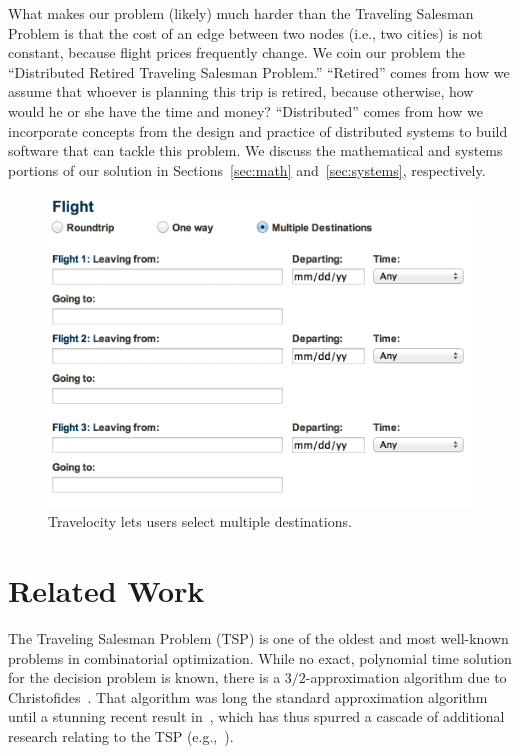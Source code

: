 \documentclass{article}
\begin{document}
What makes our problem (likely) much harder than the Traveling Salesman Problem is that the cost of an edge between two nodes (i.e., two cities) is
not constant, because flight prices frequently change. We coin our problem the ``Distributed Retired Traveling Salesman Problem.'' ``Retired'' comes
from how we assume that whoever is planning this trip is retired, because otherwise, how would he or she have the time and money?  ``Distributed''
comes from how we incorporate concepts from the design and practice of distributed systems to build software that can tackle this problem. We discuss
the mathematical and systems portions of our solution in Sections~\ref{sec:math} and~\ref{sec:systems}, respectively.

\begin{figure}[t]
\vskip 0.2in
\begin{center}
\centerline{\includegraphics[width=\columnwidth]{travelocity}}
\caption{Travelocity lets users select multiple destinations.}
\label{fig:travelocity}
\end{center}
\vskip -0.2in
\end{figure}

\section{Related Work}\label{sec:related_work}

The Traveling Salesman Problem (TSP) is one of the oldest and most well-known problems in combinatorial optimization. While no exact, polynomial time
solution for the decision problem is known, there is a $3/2$-approximation algorithm due to Christofides~\cite{Chr76}. That algorithm was long the
standard approximation algorithm until a stunning recent result in~\cite{conf/focs/GharanSS11}, which has thus spurred a cascade of additional
research relating to the TSP (e.g.,~\cite{Moemke:2011:AGT:2082752.2082898}).
\end{document}
